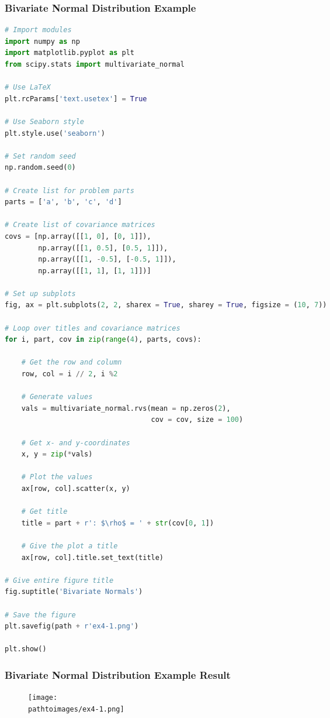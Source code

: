 \documentclass{beamer}
\newcommand{\pathtoimages}{/Users/charlesrambo/Desktop/Bootcamp24/Images}
\begin{document}
\begin{frame}[fragile]
\frametitle{Bivariate Normal Distribution Example}
\begin{multicols}{2}
\begin{lstlisting}[language=Python]
# Import modules
import numpy as np
import matplotlib.pyplot as plt
from scipy.stats import multivariate_normal

# Use LaTeX
plt.rcParams['text.usetex'] = True

# Use Seaborn style
plt.style.use('seaborn')

# Set random seed
np.random.seed(0)

# Create list for problem parts
parts = ['a', 'b', 'c', 'd']

# Create list of covariance matrices
covs = [np.array([[1, 0], [0, 1]]), 
        np.array([[1, 0.5], [0.5, 1]]), 
        np.array([[1, -0.5], [-0.5, 1]]), 
        np.array([[1, 1], [1, 1]])]

# Set up subplots
fig, ax = plt.subplots(2, 2, sharex = True, sharey = True, figsize = (10, 7))

# Loop over titles and covariance matrices 
for i, part, cov in zip(range(4), parts, covs):
    
    # Get the row and column
    row, col = i // 2, i %2

    # Generate values
    vals = multivariate_normal.rvs(mean = np.zeros(2), 
                                   cov = cov, size = 100)
    
    # Get x- and y-coordinates
    x, y = zip(*vals)
    
    # Plot the values
    ax[row, col].scatter(x, y)
    
    # Get title
    title = part + r': $\rho$ = ' + str(cov[0, 1])
    
    # Give the plot a title
    ax[row, col].title.set_text(title)

# Give entire figure title
fig.suptitle('Bivariate Normals')

# Save the figure
plt.savefig(path + r'ex4-1.png')

plt.show()
\end{lstlisting}
\end{multicols}
\end{frame}

\begin{frame}
\frametitle{Bivariate Normal Distribution Example Result}
\begin{figure}
\centering
\texttt{[image: \\pathtoimages/ex4-1.png]}
\end{figure}
\end{frame}
\end{document}
